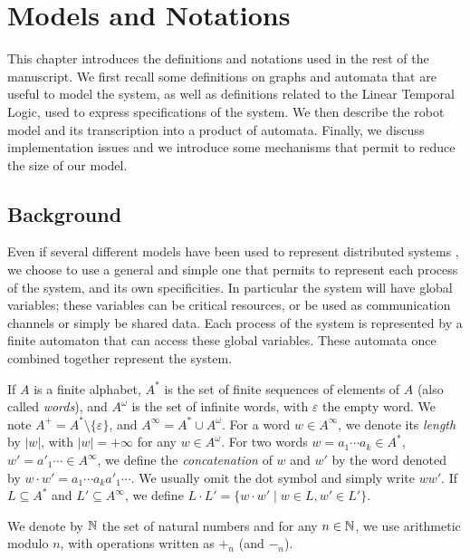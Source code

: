
\chapter{Models and Notations}
\label{chap:model}

This chapter introduces the definitions and notations used in the rest of the manuscript. 
We first recall some definitions on graphs and automata that are useful to model the system, 
as well as definitions related to the Linear Temporal Logic, used to express specifications 
of the system. 
We then describe the robot model and its transcription into a product of automata. Finally, we discuss  
implementation issues and we introduce some mechanisms that permit 
to reduce the size of our model.

\section{Background}
Even if several different models have been used to represent
distributed systems \cite{DBLP:books/mk/Lynch96,Tel:2001:IDA:517021,baier_principles_2008}, 
we choose to use a general and
simple one that permits to represent each process of the system, and
its own specificities. 
In particular the system will have global variables; these variables
can be critical resources, or be used as communication channels or
simply be shared data. Each process of the system is represented by a
finite automaton that can access these global variables.  These
automata once combined together represent the system.

\bigskip If $A$ is a finite alphabet, $A^*$ is the set of finite
sequences of elements of $A$ (also called \emph{words}), and
$A^\omega$ is the set of infinite words, with $\varepsilon$ the empty
word. We note $A^+=A^*\setminus \{\varepsilon\}$, and
$A^\infty=A^*\cup A^\omega$. For a word $w\in A^\infty$, we denote its
\emph{length} by $|w|$, with $|w|=+\infty$ for any $w\in
A^\omega$. For two words $w=a_1\cdots a_k\in A^*$, $w'=a'_1\cdots\in
A^\infty$, we define the \emph{concatenation} of $w$ and $w'$ by the
word denoted by $w\cdot w'=a_1\cdots a_ka'_1\cdots$. We usually omit
the dot symbol and simply write $ww'$.  If $L\subseteq A^*$ and
$L'\subseteq A^\infty$, we define $L\cdot L'=\{w\cdot w'\mid w\in L,
w'\in L'\}$.

We denote by $\mathbb{N}$ the set of natural numbers and for any $n \in \mathbb{N}$, we 
use arithmetic modulo $n$, with operations written as $+_n$ (and $-_n$).

